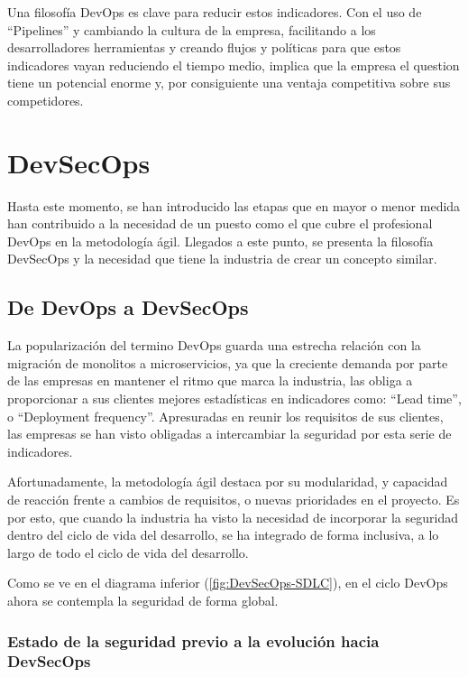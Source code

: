 \documentclass[12pt]{report} %
\begin{document}
Una filosofía DevOps es clave para reducir estos indicadores.  Con el uso de
``Pipelines'' y cambiando la cultura de la empresa, facilitando a los
desarrolladores herramientas y creando flujos y políticas para que estos
indicadores vayan reduciendo el tiempo medio, implica que la empresa el question
tiene un potencial enorme y, por consiguiente una ventaja competitiva sobre sus
competidores.

\chapter{DevSecOps}

Hasta este momento, se han introducido las etapas que en mayor o menor medida
han contribuido a la necesidad de un puesto como el que cubre el profesional
DevOps en la metodología ágil.
Llegados a este punto, se presenta la filosofía DevSecOps y la necesidad que
tiene la industria de crear un concepto similar. 

\section{De DevOps a DevSecOps}

La popularización del termino \gls{DevOps} guarda una estrecha relación con la
migración de monolitos a microservicios, ya que la creciente demanda por parte
de las empresas en mantener el ritmo que marca la industria, las obliga a
proporcionar a sus clientes mejores estadísticas en indicadores como: ``Lead
time'', o ``Deployment frequency''.
Apresuradas en reunir los requisitos de sus clientes, las empresas se han visto
obligadas a intercambiar la seguridad por esta serie de indicadores.

Afortunadamente, la metodología ágil destaca por su modularidad, y capacidad de
reacción frente a cambios de requisitos, o nuevas prioridades en el proyecto.
Es por esto, que cuando la industria ha visto la necesidad de incorporar la
seguridad dentro del ciclo de vida del desarrollo, se ha integrado de forma
inclusiva, a lo largo de todo el ciclo de vida del desarrollo.

Como se ve en el diagrama inferior (\ref{fig:DevSecOps-SDLC}), en el ciclo \gls{DevOps}
ahora se contempla la seguridad de forma global.

\subsection{Estado de la seguridad previo a la evolución hacia DevSecOps}
 
\end{document}
